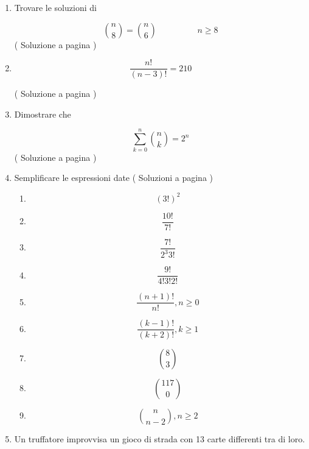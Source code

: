 \begin{enumerate}
\item

Trovare le soluzioni di

\[
\binom{n}{8}=\binom{n}{6} \hspace{2cm} n \geq 8
\]
( Soluzione a pagina \pageref{combs_01} \label{combl_01} )



\item 

\[
\frac{n!}{(n-3)!} = 210
\]

( Soluzione a pagina \pageref{combs_02} \label{combl_02} )

\item
Dimostrare che 

\[
\sum_{k=0}^{n}{\binom{n}{k}}=2^n
\]
( Soluzione a pagina \pageref{combs_03} \label{combl_03} )


\item Semplificare le espressioni date
( Soluzioni a pagina \pageref{combs_04} \label{combl_04} )

\begin{enumerate}

\item
\[
(3!)^2
\]


\item 
\[
\frac{10!}{7!}
\]

\item 
\[
\frac{7!}{2^3 3!}
\]

\item 
\[
\frac{9!}{4!3!2!}
\]

\item 
\[
\frac{(n+1)!}{n!}, n\ge 0
\]

\item 
\[
\frac{(k-1)!}{(k+2)!}, k\ge 1
\]

\item 
\[
\binom{8}{3}
\]

\item 
\[
\binom{117}{0}
\]

\item 
\[
\binom{n}{n-2}, n \ge 2
\]

\end{enumerate}


\item

Un truffatore improvvisa un gioco di strada con 13 carte differenti tra di loro.


\end{enumerate}
